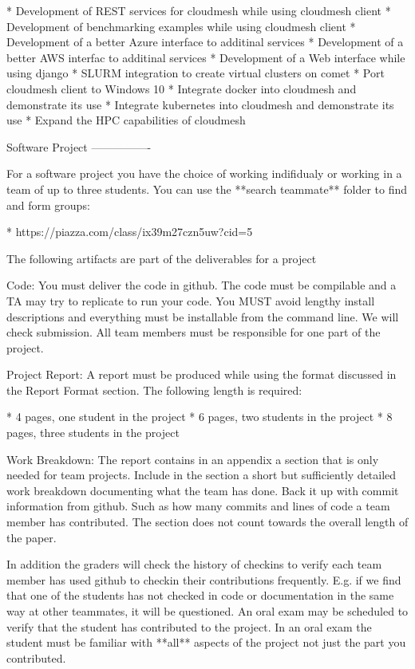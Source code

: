   * Development of REST services for cloudmesh while using cloudmesh
    client
  * Development of benchmarking examples while using cloudmesh client
  * Development of a better Azure interface to additinal services
  * Development of a better AWS interfac to additinal services
  * Development of a Web interface while using django
  * SLURM integration to create virtual clusters on comet
  * Port cloudmesh client to Windows 10
  * Integrate docker into cloudmesh and demonstrate its use
  * Integrate kubernetes into cloudmesh and demonstrate its use
  * Expand the HPC capabilities of cloudmesh

  
  
Software Project
----------------

For a software project you have the choice of working indifidualy or
working in a team of up to three students. You can use the **search
teammate** folder to find and form groups:

* https://piazza.com/class/ix39m27czn5uw?cid=5

The following artifacts are part of the deliverables for a project

Code:
    You must deliver the code in github. The code must be compilable
    and a TA may try to replicate to run your code. You MUST avoid
    lengthy install descriptions and everything must be installable
    from the command line. We will check submission. All team members
    must be responsible for one part of the project.

Project Report:
    A report must be produced while using the format discussed in the
    Report Format section. The following length is required:

    * 4 pages, one student in the project
    * 6 pages, two students in the project
    * 8 pages, three students in the project

Work Breakdown:
    The report contains in an appendix a section that is
    only needed for team projects. Include in the section a short but
    sufficiently detailed work breakdown documenting what the team has
    done. Back it up with commit information from github. Such as how
    many commits and lines of code a team member has contributed. The
    section does not count towards the overall length of the paper.

    In addition the graders will check the history of checkins to
    verify each team member has used github to checkin their
    contributions frequently. E.g. if we find that one of the students
    has not checked in code or documentation in the same way at other
    teammates, it will be questioned. An oral exam may be scheduled to
    verify that the student has contributed to the project. In an oral
    exam the student must be familiar with **all** aspects of the
    project not just the part you contributed.

